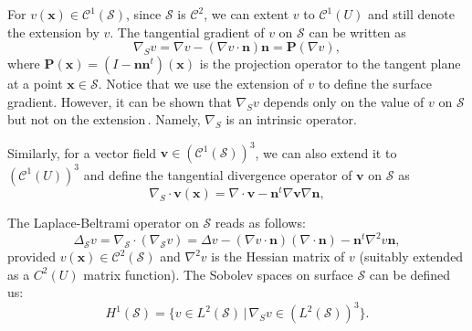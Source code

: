 \documentclass[final,1p,times]{elsarticle}
\newcommand{\bx}{\mathbf{x}}
\newcommand{\calS}{\mathcal{S}}
\begin{document}
For $v(\bx)\in \mathcal C^1(\calS)$, since $\calS$ is $\mathcal C^2$, we can extent $v$ to $\mathcal C^1(U)$
and still denote the extension by $v$. The tangential gradient of
$v$ on $\calS$ can be written as 
\begin{equation*}
    \nabla_S v = \nabla v - (\nabla v\cdot\boldsymbol n)\boldsymbol n =
    \boldsymbol P(\nabla v),
\end{equation*}
where $\boldsymbol P(\bx) = (I - \boldsymbol n\boldsymbol n^t)(\bx)$ is the projection operator
to the tangent plane at a point $\bx\in \calS$. Notice that we use the extension of
$v$ to define the surface gradient. However, it can be shown that $\nabla_S v$ depends only
on the value of $v$ on $\calS$ but not on the
extension\,\cite{Demlow2009}. Namely, $\nabla_S$ is an intrinsic
operator. 

Similarly, for a vector field $\boldsymbol v \in (\mathcal
C^1(\calS))^3$, we can also extend it
to $(\mathcal C^1(U))^3$ and define the tangential divergence operator of
$\boldsymbol v$ on $\calS$ as
\begin{equation*}
    \nabla_S\cdot \boldsymbol v(\bx) = \nabla\cdot\boldsymbol v - \boldsymbol
    n^t\nabla \boldsymbol
    v\nabla\boldsymbol n,
\end{equation*}

The Laplace-Beltrami operator on $\calS$ reads as follows:
\begin{equation*}
    \Delta_\calS v = \nabla_\calS\cdot(\nabla_\calS v) = \Delta v - (\nabla v\cdot\mathbf
    n)(\nabla\cdot\mathbf n) - \mathbf n^t\nabla^2 v \mathbf n,
\end{equation*}
provided $v(\bx) \in \mathcal C^2(\calS)$ and $\nabla^2 v$ is the Hessian matrix of $v$ (suitably
extended as a $C^2(U)$ matrix function). The Sobolev
spaces on surface $\calS$ can be defined us:
\begin{equation*}
    H^1(\calS) = \{v\in L^2(\calS)\, |\, \nabla_S v \in
    (L^2(\calS))^3 \}.
\end{equation*}
\end{document}
